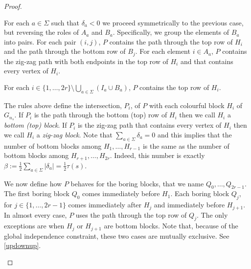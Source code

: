 \documentclass{patmorin}
\begin{document}
\begin{proof}
\begin{compactenum}
        \item For each $a\in\Sigma$ such that $\delta_a<0$ we proceed symmetrically to the previous case, but reversing the roles of $A_a$ and $B_a$.  Specifically, we group the elements of $B_a$ into pairs.  For each pair $(i,j)$, $P$ contains the path through the top row of $H_i$ and the path through the bottom row of $B_j$.  For each element $i\in A_a$, $P$ contains the zig-zag path with both endpoints in the top row of $H_i$ and that contains every vertex of $H_i$.

        \item For each $i\in\{1,\ldots,2r\}\setminus\bigcup_{a\in\Sigma}(I_a\cup B_a)$, $P$ contains the top row of $H_i$.
    \end{compactenum}
    The rules above define the intersection, $P_i$, of $P$ with each colourful block $H_i$ of $G_{n_s}$.  If $P_i$ is the path through the bottom (top) row of $H_i$ then we call $H_i$ a \emph{bottom (top) block}.  If $P_i$ is the zig-zag path that contains every vertex of $H_i$ then we call $H_i$ a \emph{zig-zag block}.  Note that $\sum_{a\in\Sigma} \delta_a = 0$ and this implies that the number of bottom blocks among $H_1,\ldots,H_{r-1}$ is the same as the number of bottom blocks among $H_{r+1},\ldots,H_{2r}$.  Indeed, this number is exactly $\beta:=\tfrac{1}{2}\sum_{a\in\Sigma} |\delta_a|=\tfrac{1}{2}\tau(s)$.

    We now define how $P$ behaves for the boring blocks, that we name $Q_0,\ldots,Q_{2r-1}$. The first boring block $Q_0$ comes immediately before $H_1$. Each boring block $Q_j$, for $j\in\{1,\ldots,2r-1\}$ comes immediately after $H_j$ and immediately before $H_{j+1}$.  In almost every case, $P$ uses the path through the top row of $Q_j$.  The only exceptions are when $H_j$ or $H_{j+1}$ are bottom blocks. Note that, because of the global independence constraint, these two cases are mutually exclusive. See \cref{updownup}.

    \begin{figure}
    \end{figure}


\end{proof}
\end{document}
